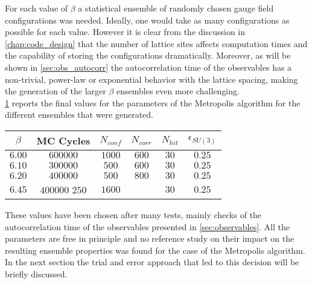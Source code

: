 For each value of $\beta$ a statistical ensemble of randomly chosen gauge field configurations was needed. Ideally, one would take as many configurations as possible for each value. However it is clear from the discussion in \cref{chap:code_design} that the number of lattice sites affects computation times and the capability of storing the configurations dramatically. Moreover, as will be shown in \cref{sec:obs_autocorr} the autocorrelation time of the observables has a non-trivial, power-law or exponential behavior with the lattice spacing, making the generation of the larger $\beta$ ensembles even more challenging.\\
\cref{runs:mcparams} reports the final values for the parameters of the Metropolis algorithm for the different ensembles that were generated.
\begin{table}[!htb]
    \begin{center}
    \begin{tabular}{cccccc}
        $\beta$ & MC Cycles & $N_{conf}$ & $N_{corr}$ &  $N_{hit}$ & $\epsilon_{SU(3)}$\\\hline
        $6.00$ & $600000$ & $1000$ & $600$ & $30$ & $0.25$\\
        $6.10$ & $300000$ & $500$ & $600$ & $30$ & $0.25$\\
        $6.20$ & $400000$ & $500$ & $800$ & $30$ & $0.25$\\
        $6.45$ & $400000$ $250$ & $1600$ & & $30$ & $0.25$
    \end{tabular}
    \label{runs:mcparams} 
    \end{center}
\end{table}
These values have been chosen after many tests, mainly checks of the autocorrelation time of the observables presented in \cref{sec:observables}. All the parameters are free in principle and no reference study on their impact on the resulting ensemble properties was found for the case of the Metropolis algorithm. In the next section the trial and error approach that led to this decision will be briefly discussed.\\
